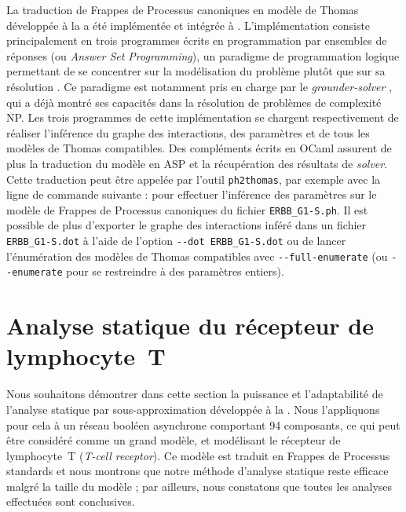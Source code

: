 La traduction de Frappes de Processus canoniques en modèle de Thomas développée
à la  a été implémentée et intégrée à \Pint.
L'implémentation consiste principalement en trois programmes
écrits en programmation par ensembles de réponses
(ou \textit{Answer Set Programming}),
un paradigme de programmation logique permettant de se concentrer sur la modélisation
du problème plutôt que sur sa résolution \cite{Baral03}.
Ce paradigme est notamment pris en charge par le \textit{grounder-solver} 
\cite{gekakasc14b},
qui a déjà montré ses capacités dans la résolution de problèmes de complexité NP.
Les trois programmes de cette implémentation se chargent respectivement
de réaliser l'inférence
du graphe des interactions, des paramètres et de tous les modèles de Thomas compatibles.
Des compléments écrits en OCaml assurent de plus la traduction du modèle en ASP
et la récupération des résultats de \textit{solver}.
Cette traduction peut être appelée par l'outil \texttt{ph2thomas}, par exemple avec la
ligne de commande suivante :
pour effectuer l'inférence des paramètres sur le modèle de Frappes de Processus canoniques
du fichier \texttt{ERBB\_G1-S.ph}.
Il est possible de plus d'exporter le graphe des interactions inféré dans un fichier
\texttt{ERBB\_G1-S.dot} à l'aide de l'option \texttt{-{}-dot ERBB\_G1-S.dot}
ou de lancer l'énumération des modèles de Thomas compatibles
avec \texttt{-{}-full-enumerate} (ou \texttt{-{}-enumerate} pour se restreindre
à des paramètres entiers).




\section{Analyse statique du récepteur de lymphocyte~T}

Nous souhaitons démontrer dans cette section la puissance et l'adaptabilité
de l'analyse statique par sous-approximation développée à la .
Nous l'appliquons pour cela à un réseau booléen asynchrone
comportant 94 composants, ce qui peut être considéré comme un grand modèle,
et modélisant le récepteur de lymphocyte~T (\textit{T-cell receptor}).
Ce modèle est traduit en Frappes de Processus standards
et nous montrons que notre méthode d'analyse statique reste efficace malgré la taille du modèle ;
par ailleurs, nous constatons que toutes les analyses effectuées sont conclusives.

\myskip

